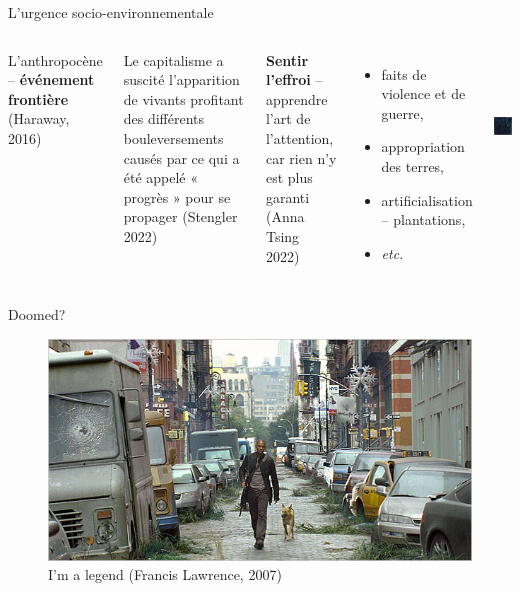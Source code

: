 \documentclass[newPxFont]{beamer}
\begin{document}
\begin{frame}[c]{L'urgence socio-environnementale}
  \vspace{-1cm}
  \begin{columns}[onlytextwidth,T]
    \column{\dimexpr\linewidth-30mm-5mm}

    L'anthropocène -- \textbf{événement frontière} (Haraway, 2016)

    Le capitalisme a suscité l'apparition de vivants profitant des différents bouleversements causés par ce qui a été appelé « progrès » pour se propager (Stengler 2022)

    \textbf{Sentir l'effroi} -- apprendre l'art de l'attention, car rien n'y est plus garanti (Anna Tsing 2022)

    \begin{itemize}
      \item faits de violence et de guerre,
      \item appropriation des terres,
      \item artificialisation -- plantations,
      \item \textit{etc.}
    \end{itemize}

    \column{30mm}
    \vspace{2cm}
    \includegraphics[height=4cm]{img/Honduras.jpg}

  \end{columns}
\end{frame}

\begin{frame}[c]{Doomed?}
\vspace{-1cm}

\begin{figure}
  \includegraphics[width=\textwidth]{img/im_legend-600.jpg}
  \caption{I'm a legend (Francis Lawrence, 2007)}
\end{figure}
\end{frame}
\end{document}
